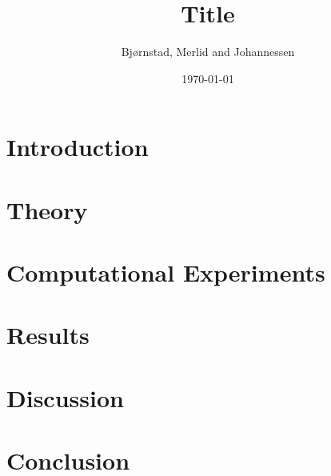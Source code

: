 \documentclass[aps,rmp,reprint,amsmath,amssymb,longbibliography,twocolumn,floatfix]{revtex4-1}
\begin{document}
\title{Title}

\author{Bjørnstad, Merlid and Johannessen}
\date{\today}


\begin{abstract}

\end{abstract}
\maketitle

\tableofcontents

\section{Introduction}
\label{sec:introduction}

\section{Theory}


\section{Computational Experiments}


\section{Results}


\section{Discussion}


\section{Conclusion}


\newpage

\appendix
\label{appendix}

\end{document}
